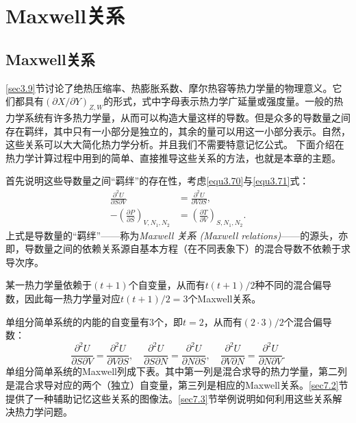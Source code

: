 
\chapter{Maxwell关系}
\label{chap7}

\section{Maxwell关系}
\label{sec7.1}
\ref{sec3.9}节讨论了绝热压缩率、热膨胀系数、摩尔热容等热力学量的物理意义。它们都具有$(\partial X / \partial Y)_{Z, W}$的形式，式中字母表示热力学广延量或强度量。一般的热力学系统有许多热力学量，从而可以构造大量这样的导数。但是众多的导数量之间存在羁绊，其中只有一小部分是独立的，其余的量可以用这一小部分表示。自然，这些关系可以大大简化热力学分析。并且我们不需要特意记忆公式。 下面介绍在热力学计算过程中用到的简单、直接推导这些关系的方法，也就是本章的主题。

首先说明这些导数量之间“羁绊”的存在性，考虑\eqref{equ3.70}与\eqref{equ3.71}式：
\begin{align}
	\frac{\partial^2 U}{\partial S \partial V} &= \frac{\partial^2 U}{\partial V \partial S}, \label{equ7.1} \\
	-\left( \frac{\partial P}{\partial S} \right)_{V, N_1, N_2} &= \left( \frac{\partial T}{\partial V} \right)_{S, N_1, N_2}. \label{equ7.2}
\end{align}
上式是导数量的“羁绊”——称为{\it Maxwell 关系 (Maxwell relations)}——的源头，亦即，导数量之间的依赖关系源自基本方程（在不同表象下）的混合导数不依赖于求导次序。

某一热力学量依赖于$(t + 1)$个自变量，从而有$t(t + 1)/2$种不同的混合偏导数，因此每一热力学量对应$t(t + 1)/2 = 3$个Maxwell关系。

单组分简单系统的内能的自变量有$3$个，即$t = 2$，从而有$(2 \cdot 3)/2$个混合偏导数：
\[
	\frac{\partial^2 U}{\partial S \partial V} = \frac{\partial^2 U}{\partial V \partial S}, \quad \frac{\partial^2 U}{\partial S \partial N} = \frac{\partial^2 U}{\partial N \partial S}, \quad \frac{\partial^2 U}{\partial V \partial N} = \frac{\partial^2 U}{\partial N \partial V}.
\]
单组分简单系统的Maxwell列成下表。其中第一列是混合求导的热力学量，第二列是混合求导对应的两个（独立）自变量，第三列是相应的Maxwell关系。\ref{sec7.2}节提供了一种辅助记忆这些关系的图像法。\ref{sec7.3}节举例说明如何利用这些关系解决热力学问题。

